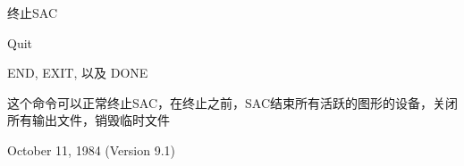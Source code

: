 \label{cmd:quit}

终止SAC

Quit

END, EXIT, 以及 DONE 

这个命令可以正常终止SAC，在终止之前，SAC结束所有活跃的图形的设备，关闭所有输出文件，销毁临时文件

October 11, 1984 (Version 9.1)

